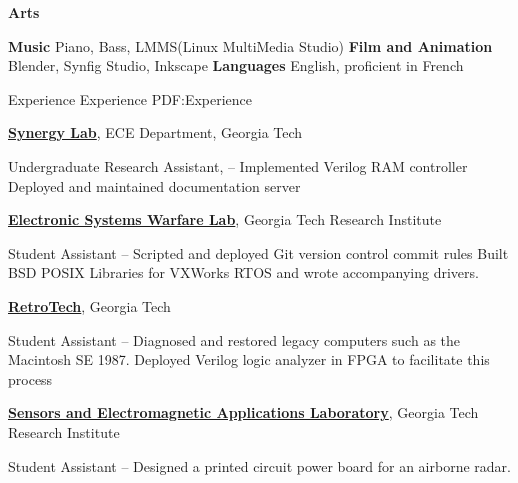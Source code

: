 \documentclass[letterpaper,MMMyyyy,nonstopmode]{simpleresumecv}
\begin{document}
\begin{Body}
\BigGap
\Entry
\textbf{Arts}
\begin{Detail}
\BulletItem
\textbf{Music}
\SubBulletItem
Piano, Bass, LMMS(Linux MultiMedia Studio)
\BulletItem
\textbf{Film and Animation}
\SubBulletItem
Blender, Synfig Studio, Inkscape
\BulletItem
\textbf{Languages}
\SubBulletItem
English, proficient in French
\end{Detail}


\Section
{Experience}
{Experience}
{PDF:Experience}

\Entry
\href{http://synergy.ece.gatech.edu}
{\textbf{Synergy Lab}},
ECE Department, Georgia Tech
\begin{Detail}
\BulletItem
Undergraduate Research Assistant,
\hfill
{} --
\SubBulletItem
Implemented Verilog RAM controller
\SubBulletItem
Deployed and maintained documentation server
\end{Detail}

\Entry
\href{https://www.gtri.gatech.edu/laboratories/electronic-systems-laboratory}
{\textbf{Electronic Systems Warfare Lab}},
Georgia Tech Research Institute
\begin{Detail}
\BulletItem
Student Assistant
\hfill
{} --
\SubBulletItem
Scripted and deployed Git version control commit rules
\SubBulletItem
Built BSD POSIX Libraries for VXWorks RTOS and wrote accompanying drivers.
\end{Detail}

\Entry
\href{http://retrotech.library.gatech.edu}
{\textbf{RetroTech}},
Georgia Tech
\begin{Detail}
\BulletItem
Student Assistant
\hfill
{} --
\SubBulletItem
Diagnosed and restored legacy computers such as the Macintosh SE 1987. Deployed Verilog logic analyzer in FPGA to facilitate this process
\end{Detail}

\Entry
\href{https://www.gtri.gatech.edu/laboratories/sensors-and-electromagnetic-applications-laboratory}
{\textbf{Sensors and Electromagnetic Applications Laboratory}},
Georgia Tech Research Institute
\begin{Detail}
\BulletItem
Student Assistant
\hfill
{} --
\SubBulletItem
Designed a printed circuit power board for an airborne radar. 
\end{Detail}


\end{Body}
\end{document}
